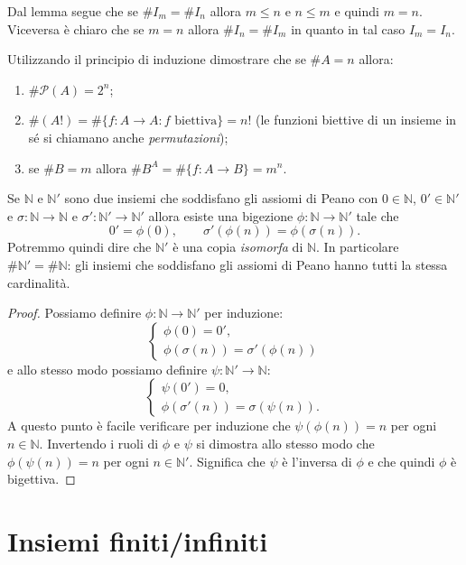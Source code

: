 \documentclass[italian,a4paper,hidelinks,headinclude]{scrartcl}
\newcommand{\NN}{{\mathbb N}}
\renewcommand{\P}{{\mathcal P}}
\begin{document}
Dal lemma segue che se $\# I_m = \# I_n$ allora $m\le n$ e $n\le m$ e quindi $m=n$.
Viceversa è chiaro che se $m=n$ allora $\# I_n = \#I_m$ in quanto in tal caso
$I_m = I_n$.

\begin{exercise}\label{ex:9478}
Utilizzando il principio di induzione dimostrare che se $\# A = n$ allora:
\begin{enumerate}
    \item $\# \P(A) = 2^n$;
    \item $\# (A!) = \# \{f\colon A \to A\colon \text{$f$ biettiva}\} = n!$
      (le funzioni biettive di un insieme in sé si chiamano anche
      \emph{permutazioni});
    \item se $\# B = m$ allora $\# B^A = \#\{f\colon A \to B\} = m^n$.
\end{enumerate}
\end{exercise}

\begin{theorem}[unicità di $\NN$]
  Se $\NN$ e $\NN'$ sono due insiemi che soddisfano gli assiomi di Peano
  con $0\in \NN$, $0'\in \NN'$ e $\sigma\colon \NN \to \NN$ e
  $\sigma'\colon \NN' \to \NN'$ allora esiste una bigezione
  $\phi\colon \NN \to \NN'$
  tale che
  \[
    0'=\phi(0), \qquad \sigma'(\phi(n)) = \phi(\sigma(n)).
  \]
  Potremmo quindi dire che $\NN'$ è una copia \emph{isomorfa} di $\NN$.
  In particolare $\#\NN' = \# \NN$: gli insiemi che soddisfano gli
  assiomi di Peano hanno tutti la stessa cardinalità.
\end{theorem}
%
\begin{proof}
Possiamo definire $\phi\colon \NN \to \NN'$ per induzione:
\[
\begin{cases}
      \phi(0) = 0',\\
      \phi(\sigma(n)) = \sigma'(\phi(n))
\end{cases}
\]
e allo stesso modo possiamo definire $\psi\colon \NN'\to \NN$:
\[
\begin{cases}
      \psi(0') = 0,\\
      \phi(\sigma'(n)) = \sigma(\psi(n)).
\end{cases}
\]
A questo punto è facile verificare per induzione che $\psi(\phi(n)) = n$ per
ogni $n\in \NN$. Invertendo i ruoli di $\phi$ e $\psi$ si dimostra allo stesso
modo che $\phi(\psi(n))=n$ per ogni $n\in \NN'$.
Significa che $\psi$ è l'inversa di $\phi$
e che quindi $\phi$ è bigettiva.
\end{proof}

\section{Insiemi finiti/infiniti}
\end{document}
